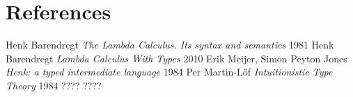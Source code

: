 \documentclass[11pt,oneside]{article}
\begin{document}
\newpage
\section{References}
\begin{thebibliography}{9}

      Henk Barendregt \textit{The Lambda Calculus. Its syntax and semantics} 1981
      Henk Barendregt \textit{Lambda Calculus With Types} 2010
       Erik Meijer, Simon Peyton Jones \textit{Henk: a typed intermediate language} 1984
        Per Martin-Löf \textit{Intuitionistic Type Theory} 1984
 ????
 ????

\end{thebibliography}
\end{document}
